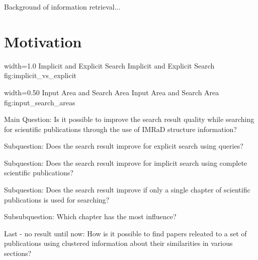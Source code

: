 Background of information retrieval...

\section{Motivation}
\label{sec:Motivation}

      {width=1.0\textwidth}
      {Implicit and Explicit Search}
      {Implicit and Explicit Search}
      {fig:implicit_vs_explicit}

      {width=0.50\textwidth}
      {Input Area and Search Area}
      {Input Area and Search Area}
      {fig:input_search_areas}


Main Question: Is it possible to improve the search result quality while searching for scientific publications through the use of IMRaD structure information?

Subquestion: Does the search result improve for explicit search using queries?

Subquestion: Does the search result improve for implicit search using complete scientific publications?

Subquestion: Does the search result improve if only a single chapter of scientific publications is used for searching?

Subsubquestion: Which chapter has the most influence?

Last - no result until now: How is it possible to find papers releated to a set of publications using clustered information about their similarities in various sections?
